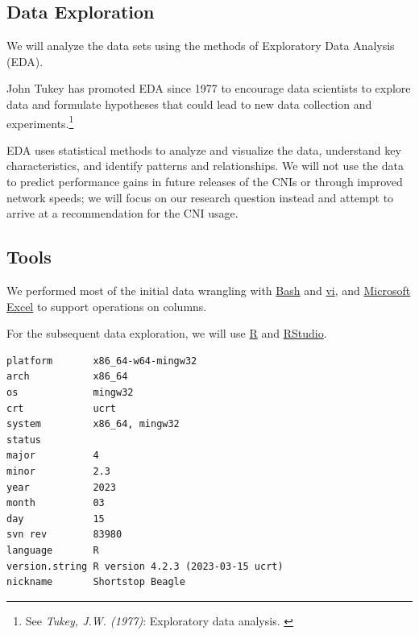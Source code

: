 \subsection{Data Exploration}

We will analyze the data sets using the methods of Exploratory Data Analysis (EDA).

John Tukey has promoted EDA since 1977 to encourage data scientists to explore data and formulate hypotheses that could lead to new data collection and experiments.\footnote{See \textit{Tukey, J.W. (1977)}: Exploratory data analysis. \cite{exploratoryDA}}

EDA uses statistical methods to analyze and visualize the data, understand key characteristics, and identify patterns and relationships. We will not use the data to predict performance gains in future releases of the CNIs or through improved network speeds; we will focus on our research question instead and attempt to arrive at a recommendation for the CNI usage.

\subsection{Tools}

We performed most of the initial data wrangling with \href{https://www.gnu.org/software/bash/}{Bash} and \href{https://pubs.opengroup.org/onlinepubs/9699919799/utilities/vi.html}{vi}, and \href{https://www.microsoft.com/en-us/microsoft-365/excel}{Microsoft Excel} to support operations on columns.

For the subsequent data exploration, we will use \href{https://www.r-project.org/}{R} and \href{https://posit.co/download/rstudio-desktop/}{RStudio}.

\begin{Shaded}
\begin{Highlighting}[]
\end{Highlighting}
\end{Shaded}

\begin{verbatim}
platform       x86_64-w64-mingw32               
arch           x86_64                           
os             mingw32                          
crt            ucrt                             
system         x86_64, mingw32                  
status                                          
major          4                                
minor          2.3                              
year           2023                             
month          03                               
day            15                               
svn rev        83980                            
language       R                                
version.string R version 4.2.3 (2023-03-15 ucrt)
nickname       Shortstop Beagle                 
\end{verbatim}
